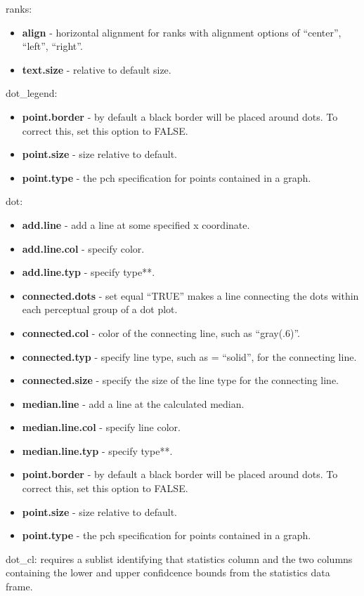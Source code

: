 \documentclass{article}
\begin{document}
ranks:
\begin{itemize}
\item \textbf{align} - horizontal alignment for ranks with alignment options of ``center'', ``left'', ``right''.
\item \textbf{text.size} - relative to default size.
\end{itemize}
dot\_legend:
\begin{itemize}
\item \textbf{point.border} - by default a black border will be placed around dots. To correct this, set this option to FALSE.
\item \textbf{point.size} - size relative to default.
\item \textbf{point.type} - the pch specification for points contained in a graph.
\end{itemize}
dot:
\begin{itemize}
\item \textbf{add.line} - add a line at some specified x coordinate.
\item \textbf{add.line.col} - specify color.
\item \textbf{add.line.typ} - specify type**.
\item \textbf{connected.dots} - set equal ``TRUE'' makes a line connecting the dots within each perceptual group of a dot plot.
\item \textbf{connected.col} - color of the connecting line, such as ``gray(.6)''.
\item \textbf{connected.typ} - specify line type, such as  = ``solid'', for the connecting line.
\item \textbf{connected.size} - specify the size of the line type for the connecting line.
\item \textbf{median.line} - add a line at the calculated median.
\item \textbf{median.line.col} - specify line color.
\item \textbf{median.line.typ} - specify type**.
\item \textbf{point.border} - by default a black border will be placed around dots. To correct this, set this option to FALSE.
\item \textbf{point.size} - size relative to default.
\item \textbf{point.type} - the pch specification for points contained in a graph.
\end{itemize}
dot\_cl: requires a sublist identifying that statistics column and the two columns containing the lower and upper confidcence bounds from the statistics data frame.
\end{document}
